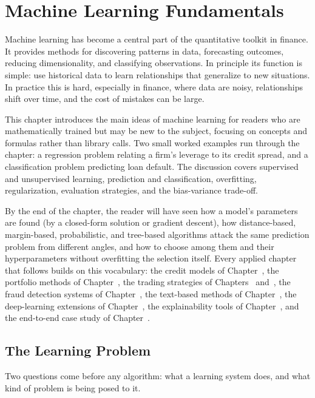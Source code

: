 \documentclass[../ai_in_finance]{subfiles}
\begin{document}
\chapter{Machine Learning Fundamentals}

Machine learning has become a central part of the quantitative toolkit in finance. It provides methods for discovering patterns in data, forecasting outcomes, reducing dimensionality, and classifying observations. In principle its function is simple: use historical data to learn relationships that generalize to new situations. In practice this is hard, especially in finance, where data are noisy, relationships shift over time, and the cost of mistakes can be large.

This chapter introduces the main ideas of machine learning for readers who are mathematically trained but may be new to the subject, focusing on concepts and formulas rather than library calls. Two small worked examples run through the chapter: a regression problem relating a firm's leverage to its credit spread, and a classification problem predicting loan default. The discussion covers supervised and unsupervised learning, prediction and classification, overfitting, regularization, evaluation strategies, and the bias-variance trade-off.

By the end of the chapter, the reader will have seen how a model's parameters are found (by a closed-form solution or gradient descent), how distance-based, margin-based, probabilistic, and tree-based algorithms attack the same prediction problem from different angles, and how to choose among them and their hyperparameters without overfitting the selection itself. Every applied chapter that follows builds on this vocabulary: the credit models of Chapter~, the portfolio methods of Chapter~, the trading strategies of Chapters~ and~, the fraud detection systems of Chapter~, the text-based methods of Chapter~, the deep-learning extensions of Chapter~, the explainability tools of Chapter~, and the end-to-end case study of Chapter~.

\section{The Learning Problem}

Two questions come before any algorithm: what a learning system does, and what kind of problem is being posed to it.
\end{document}
